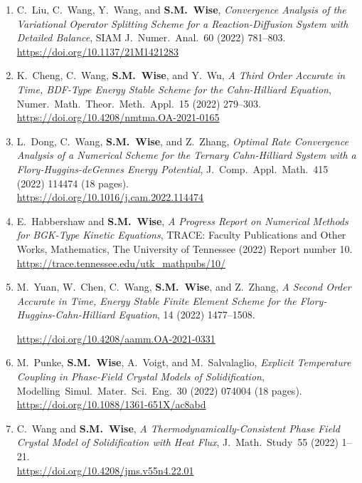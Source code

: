 \documentclass[11pt]{letter}
\begin{document}
\begin{enumerate}
	\item
C.~Liu, C.~Wang, Y.~Wang, and \textbf{S.M.~Wise}, {\sl Convergence Analysis of the Variational Operator Splitting Scheme for a Reaction-Diffusion System with Detailed Balance}, SIAM J.~Numer.~Anal.~60 (2022) 781--803.
	\\
\url{https://doi.org/10.1137/21M1421283}

	\item
K.~Cheng, C.~Wang, \textbf{S.M.~Wise}, and Y.~Wu, {\sl A Third Order Accurate in Time, BDF-Type Energy Stable Scheme for the Cahn-Hilliard Equation}, Numer.~Math.~Theor.~Meth.~Appl.~15 (2022) 279--303.
	\\
\url{https://doi.org/10.4208/nmtma.OA-2021-0165}

	\item
L.~Dong, C.~Wang, \textbf{S.M.~Wise}, and Z.~Zhang, {\sl Optimal Rate Convergence Analysis of a Numerical Scheme for the Ternary Cahn-Hilliard System with a Flory-Huggins-deGennes Energy Potential}, J.~Comp.~Appl.~Math.~415 (2022) 114474 (18 pages).
	\\
\url{https://doi.org/10.1016/j.cam.2022.114474}

	\item
E.~Habbershaw and \textbf{S.M.~Wise}, {\sl A Progress Report on Numerical Methods for BGK-Type Kinetic Equations}, TRACE: Faculty Publications and Other Works, Mathematics, The University of Tennessee (2022) Report number 10.
 	\\
\url{https://trace.tennessee.edu/utk_mathpubs/10/}

	\item
M.~Yuan, W.~Chen, C.~Wang, \textbf{S.M.~Wise}, and Z.~Zhang, {\sl A Second Order Accurate in Time, Energy Stable Finite Element Scheme for the Flory-Huggins-Cahn-Hilliard Equation}, 14 (2022) 1477--1508.

\url{https://doi.org/10.4208/aamm.OA-2021-0331}

	\item
M.~Punke, \textbf{S.M.~Wise}, A.~Voigt, and M.~Salvalaglio, {\sl  Explicit Temperature Coupling in Phase-Field Crystal Models of Solidification}, Modelling~Simul.~Mater.~Sci.~Eng.~30 (2022) 074004 (18 pages).
	\\ 
\url{https://doi.org/10.1088/1361-651X/ac8abd}

	\item
C.~Wang  and \textbf{S.M.~Wise}, {\sl A Thermodynamically-Consistent Phase Field Crystal Model of Solidification with Heat Flux}, J.~Math.~Study~55 (2022) 1--21.
	\\
\url{https://doi.org/10.4208/jms.v55n4.22.01}


\end{enumerate}
\end{document}
